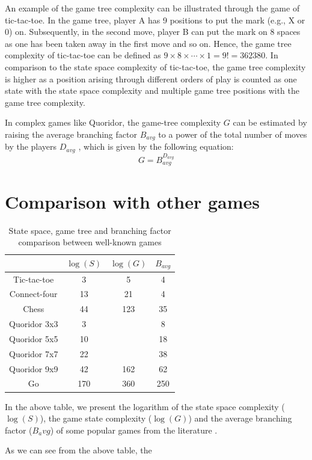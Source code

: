 An example of the game tree complexity can be illustrated through the game of tic-tac-toe. In the game tree, player A has 9 positions to put the mark (e.g., X or 0) on. Subsequently, in the second move, player B can put the mark on 8 spaces as one has been taken away in the first move and so on. Hence, the game tree complexity of tic-tac-toe can be defined as $9 \times 8 \times \cdots \times 1 = 9! = 362380$. In comparison to the state space complexity of tic-tac-toe, the game tree complexity is higher as a position arising through different orders of play is counted as one state with the state space complexity and multiple game tree positions with the game tree complexity. 


In complex games like Quoridor, the game-tree complexity $G$ can be estimated by raising the average branching factor $B_{avg}$ to a power of the total number of moves by the players $D_{avg}$ \cite{Mertens2006Quoridor}, which is given by the following equation: 
\begin{equation}
    G = B_{avg}^{D_{avg}}
\end{equation}

\section{Comparison with other games}

\begin{table}[ht]
    \centering
     \begin{tabular}{|c|c|c|c|}\hline
          & $\log(S)$ & $\log(G)$ & $B_{avg}$\\ \hline 
          Tic-tac-toe  & 3   & 5   & 4    \\ \hline
          Connect-four & 13  & 21  & 4    \\ \hline
          Chess        & 44  & 123 & 35   \\ \hline
          Quoridor 3x3     & 3  &  & 8  \\ \hline
          Quoridor 5x5     & 10  &  & 18  \\ \hline
          Quoridor 7x7    & 22  &  & 38  \\ \hline
          Quoridor 9x9     & 42  & 162 & 62  \\ \hline        
          Go           & 170 & 360 & 250 \\ \hline
     \end{tabular}
     \caption{State space, game tree and branching factor comparison between well-known games}
 \end{table}

 In the above table, we present the logarithm of the state space complexity ($\log(S)$), the game state complexity ($\log(G)$) and the average branching factor ($B_avg$) of some popular games from the literature \citep{Mertens2006Quoridor}.

 As we can see from the above table, the 